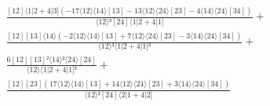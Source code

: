 \documentclass[varwidth, border=5pt]{standalone}
\begin{document}
\begin{my}
$\begin{gathered}
\scriptscriptstyle\frac{[12]⟨1|2+4|3](-17⟨12⟩⟨14⟩[13]-13⟨12⟩⟨24⟩[23]-4⟨14⟩⟨24⟩[34])}{⟨12⟩³[24]⟨1|2+4|1]} +\\
\scriptscriptstyle\frac{[12][13]⟨14⟩(-2⟨12⟩⟨14⟩[13]+7⟨12⟩⟨24⟩[23]-3⟨14⟩⟨24⟩[34])}{⟨12⟩²⟨1|2+4|1]²} +\\
\scriptscriptstyle\frac{6[12][13]²⟨14⟩²⟨24⟩[24]}{⟨12⟩⟨1|2+4|1]³} +\\
\scriptscriptstyle\frac{[12][23](17⟨12⟩⟨14⟩[13]+14⟨12⟩⟨24⟩[23]+3⟨14⟩⟨24⟩[34])}{⟨12⟩²[24]⟨2|1+4|2]} \phantom{+}
\end{gathered}$
\end{my}
\end{document}
